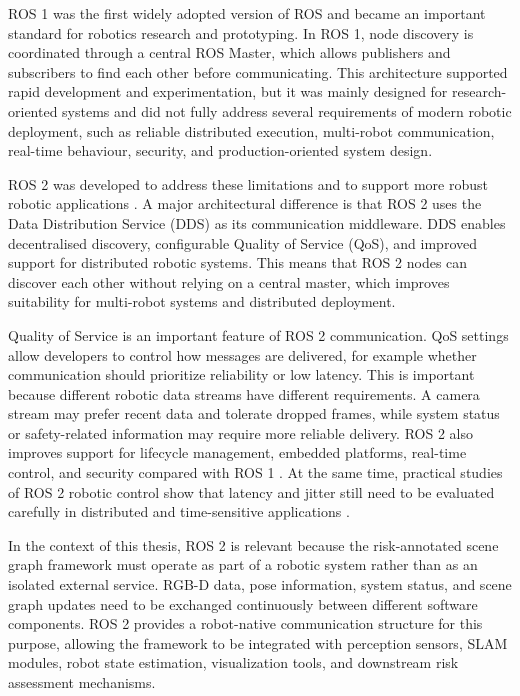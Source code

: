{\small

ROS 1 was the first widely adopted version of ROS and became an important standard for robotics research and prototyping. In ROS 1, node discovery is coordinated through a central ROS Master, which allows publishers and subscribers to find each other before communicating. This architecture supported rapid development and experimentation, but it was mainly designed for research-oriented systems and did not fully address several requirements of modern robotic deployment, such as reliable distributed execution, multi-robot communication, real-time behaviour, security, and production-oriented system design.

ROS 2 was developed to address these limitations and to support more robust robotic applications \cite{macenski2022ros2}. A major architectural difference is that ROS 2 uses the Data Distribution Service (DDS) as its communication middleware. DDS enables decentralised discovery, configurable Quality of Service (QoS), and improved support for distributed robotic systems. This means that ROS 2 nodes can discover each other without relying on a central master, which improves suitability for multi-robot systems and distributed deployment.

Quality of Service is an important feature of ROS 2 communication. QoS settings allow developers to control how messages are delivered, for example whether communication should prioritize reliability or low latency. This is important because different robotic data streams have different requirements. A camera stream may prefer recent data and tolerate dropped frames, while system status or safety-related information may require more reliable delivery. ROS 2 also improves support for lifecycle management, embedded platforms, real-time control, and security compared with ROS 1 \cite{macenski2022ros2}. At the same time, practical studies of ROS 2 robotic control show that latency and jitter still need to be evaluated carefully in distributed and time-sensitive applications \cite{puck2021ros2realtime}.

In the context of this thesis, ROS 2 is relevant because the risk-annotated scene graph framework must operate as part of a robotic system rather than as an isolated external service. RGB-D data, pose information, system status, and scene graph updates need to be exchanged continuously between different software components. ROS 2 provides a robot-native communication structure for this purpose, allowing the framework to be integrated with perception sensors, SLAM modules, robot state estimation, visualization tools, and downstream risk assessment mechanisms.

}
\fi

























